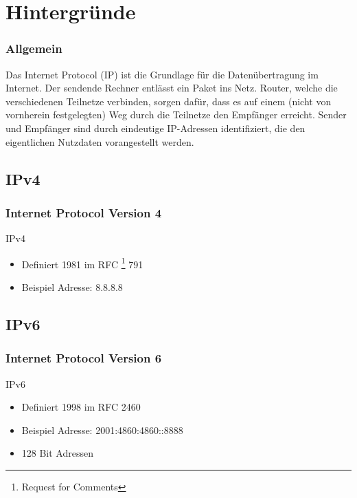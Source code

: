 \documentclass[xcolor=dvipsnames]{beamer}
\subtitle{Modul WIN11} %
\institute{AKAD Pinneberg + Stuttgart} %
\title{\Title}
\author{\Author}
\date{\today}
\begin{document}
\begin{frame}
    \titlepage
\end{frame}


\frame{\tableofcontents} 

 
\section{Hintergründe}
\begin{frame} %
 \frametitle{Allgemein}
Das Internet Protocol (IP) ist die Grundlage für die Datenübertragung im Internet. Der sendende Rechner entlässt ein Paket ins Netz. Router, welche die verschiedenen Teilnetze verbinden, sorgen dafür, dass es auf einem (nicht von vornherein festgelegten) Weg durch die Teilnetze den Empfänger erreicht. Sender und Empfänger sind durch eindeutige IP-Adressen identifiziert, die den eigentlichen Nutzdaten vorangestellt werden.
\end{frame}


\subsection{IPv4}
\begin{frame}
 \frametitle{Internet Protocol Version 4}
  \begin{block}{IPv4}
	  \begin{itemize}
	  	\item Definiert 1981 im RFC \footnote{Request for Comments} 791
	  	\item Beispiel Adresse: 8.8.8.8
	  \end{itemize}
  \end{block}
\end{frame}

\subsection{IPv6}
\begin{frame}
  \frametitle{Internet Protocol Version 6}
  \begin{block}{IPv6}
	  \begin{itemize}
  		\item Definiert 1998 im RFC 2460 
  		\item Beispiel Adresse: 2001:4860:4860::8888
  		\item 128 Bit Adressen
	  \end{itemize}
  \end{block}
\end{frame}
\end{document}
